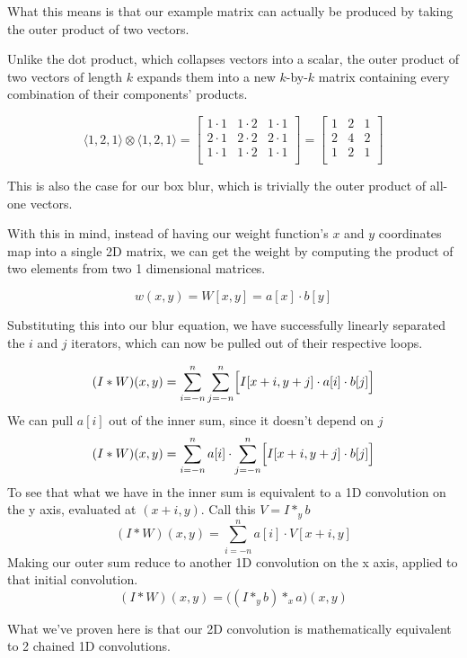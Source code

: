 \documentclass{article}
\begin{document}
\begin{appendices}
What this means is that our example matrix can actually be produced by taking the outer product of two vectors.

Unlike the dot product, which collapses vectors into a scalar, the outer product of two vectors of length $k$ expands them into a new $k$-by-$k$ matrix containing every combination of their components' products.

\[
    \langle1, 2, 1\rangle \otimes \langle1, 2, 1\rangle
    =
    \begin{bmatrix}
        1\cdot1 & 1\cdot2 & 1\cdot1 \\
        2\cdot1 & 2\cdot2 & 2\cdot1 \\
        1\cdot1 & 1\cdot2 & 1\cdot1 \\
    \end{bmatrix}
    =
    \begin{bmatrix}
        1 & 2 & 1 \\
        2 & 4 & 2 \\
        1 & 2 & 1 \\
    \end{bmatrix}
\]

This is also the case for our box blur, which is trivially the outer product of all-one vectors.

With this in mind, instead of having our weight function's $x$ and $y$ coordinates map into a single 2D matrix, we can get the weight by computing the product of two elements from two 1 dimensional matrices.

\[
    w(x, y) = W[x, y] = a[x] \cdot b[y]
\]

Substituting this into our blur equation, we have successfully linearly separated the $i$ and $j$ iterators, which can now be pulled out of their respective loops.

\[
    (I * W)(x, y) = \sum^{n}_{i=-n} \sum^{n}_{j=-n} \Bigl[ I[x+i, y+j] \cdot a[i] \cdot b[j]\Bigr]
\]
We can pull $a[i]$ out of the inner sum, since it doesn't depend on $j$
\[
    (I * W)(x, y) = \sum^{n}_{i=-n} a[i] \cdot \sum^{n}_{j=-n} \Bigl[ I[x+i, y+j] \cdot b[j]\Bigr]
\]
To see that what we have in the inner sum is equivalent to a 1D convolution on the y axis, evaluated at $(x+i, y)$. Call this $V = I *_y b$
\[
    (I * W)(x, y) = \sum^{n}_{i=-n} a[i] \cdot V[x+i, y]
\]
Making our outer sum reduce to another 1D convolution on the x axis, applied to that initial convolution.
\[
    (I * W)(x, y) = \bigl((I *_y b) *_x a\bigr)(x, y)
\]

What we've proven here is that our 2D convolution is mathematically equivalent to 2 chained 1D convolutions.


\end{appendices}
\end{document}
